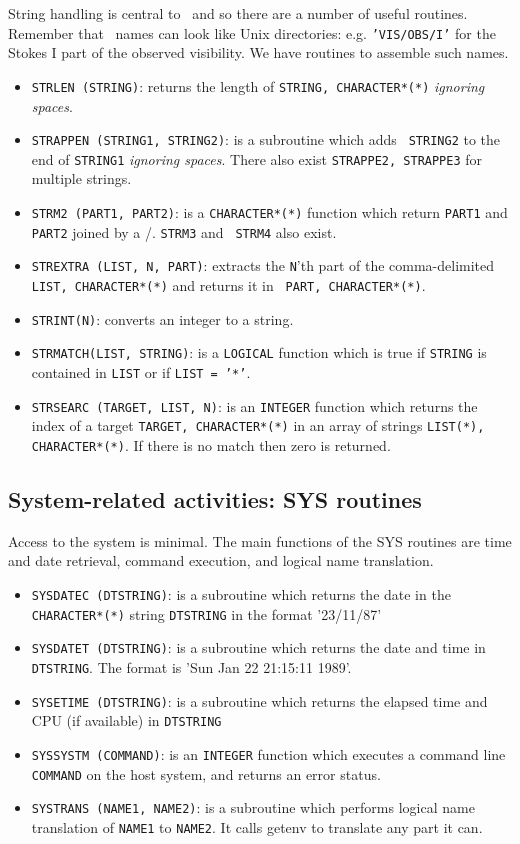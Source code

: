 String handling is central to \sde\ and so there are a number of useful
routines. Remember that \sde\ names can look like Unix directories: 
e.g. {\tt 'VIS/OBS/I'} for the Stokes I part of the observed visibility.
We have routines to assemble such names.
\begin{itemize}
\item {\tt STRLEN (STRING)}: returns the length of {\tt STRING, CHARACTER*(*)}
{\em ignoring spaces}.
\item {\tt STRAPPEN (STRING1, STRING2)}: is a subroutine which adds {\tt
STRING2} to the end of {\tt STRING1} {\em ignoring spaces}. There also
exist {\tt STRAPPE2, STRAPPE3} for multiple strings.
\item {\tt STRM2 (PART1, PART2)}: is a {\tt CHARACTER*(*)} function which
return {\tt PART1} and {\tt PART2} joined by a /. {\tt STRM3} and {\tt
STRM4} also exist.
\item {\tt STREXTRA (LIST, N, PART)}: extracts the {\tt N}'th part of the
comma-delimited {\tt LIST, CHARACTER*(*)} and returns it in {\tt
PART, CHARACTER*(*)}.
\item {\tt STRINT(N)}: converts an integer to a string.
\item {\tt STRMATCH(LIST, STRING)}: is a {\tt LOGICAL} function which is
true if {\tt STRING} is contained in {\tt LIST} or if {\tt LIST = '*'}.
\item {\tt STRSEARC (TARGET, LIST, N)}: is an {\tt INTEGER} function which
returns the index of a target {\tt TARGET, CHARACTER*(*)} in an array
of strings {\tt LIST(*), CHARACTER*(*)}. If there is no match then
zero is returned.
\end{itemize}

\subsection{System-related activities: SYS routines}

Access to the system is minimal. The main functions of the SYS routines are
time and date retrieval, command execution, and logical name translation.
\begin{itemize}
\item {\tt SYSDATEC (DTSTRING)}: is a subroutine which returns the date in
the {\tt CHARACTER*(*)} string {\tt DTSTRING} in the format '23/11/87'
\item {\tt SYSDATET (DTSTRING)}: is a subroutine which returns the date and
time in {\tt DTSTRING}. The format is 'Sun Jan 22 21:15:11 1989'.
\item {\tt SYSETIME (DTSTRING)}: is a subroutine which returns the elapsed time
and CPU (if available) in {\tt DTSTRING}
\item {\tt SYSSYSTM (COMMAND)}: is an {\tt INTEGER} function which executes
a command line {\tt COMMAND} on the host system, and returns
an error status.
\item {\tt SYSTRANS (NAME1, NAME2)}: is a subroutine which performs logical 
name translation of {\tt NAME1} to {\tt NAME2}.
It calls getenv to translate any part it can.
\end{itemize}

